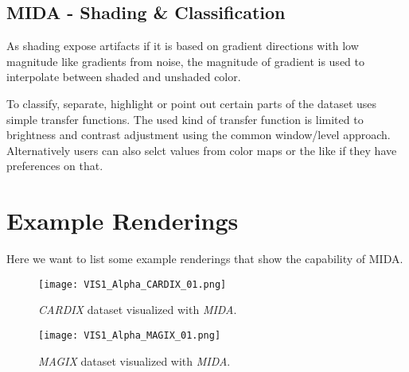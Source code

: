\subsection{MIDA - Shading \& Classification}

As shading expose artifacts if it is based on gradient directions with low magnitude like gradients from noise, the magnitude of gradient is used to interpolate between shaded and unshaded color.

To classify, separate, highlight or point out certain parts of the dataset uses simple transfer functions.
The used kind of transfer function is limited to brightness and contrast adjustment using the common window/level approach.
Alternatively users can also selct values from color maps or the like if they have preferences on that.


\section{Example Renderings}

Here we want to list some example renderings that show the capability of MIDA.

\begin{figure}[h]
	\centering
	\texttt{[image: VIS1\_Alpha\_CARDIX\_01.png]} \\
	\caption{ \emph{CARDIX}\cite{gimias_sampledata_2018} dataset visualized with \emph{MIDA}.}
	\label{fig:VIS1_Alpha_CARDIX_01}
\end{figure}


\begin{figure}[h]
	\centering
	\texttt{[image: VIS1\_Alpha\_MAGIX\_01.png]} \\
	\caption{ \emph{MAGIX}\cite{gimias_sampledata_2018} dataset visualized with \emph{MIDA}.}
	\label{fig:VIS1_Alpha_MAGIX_01}
\end{figure}
